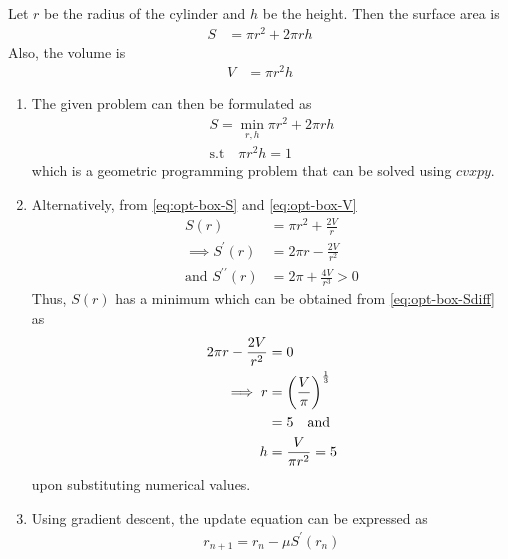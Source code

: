 \documentclass[journal,12pt,twocolumn]{IEEEtran}
\renewcommand\thesection{\arabic{section}}
\begin{document}
\begin{enumerate}[label=\thesection.\arabic*.,ref=\thesection.\theenumi]
\solution Let $r$ be the radius of the cylinder and $h$ be the height.  Then the surface area is 
		\begin{align}
			\label{eq:opt-box-S}
			S &= \pi r^2 + 2\pi r h 
		\end{align}
		Also, the volume is 
		\begin{align}
			\label{eq:opt-box-V}
			V &= \pi r^2 h 
		\end{align}
		\begin{enumerate}
			\item 
		The given problem can then be formulated as 
		\begin{align}
			S = \min_{r,h}\pi r^2 + 2\pi r h 
			\\
			\text{s.t} \quad \pi r^2 h =1 
		\end{align}
		which is a geometric programming problem that can be solved using $cvxpy$. 
	\item 
		Alternatively, from 
			\eqref{eq:opt-box-S} and 
			\eqref{eq:opt-box-V}
		\begin{align}
			S(r) &= \pi r^2 +  \frac{2 V}{r} 
			\\
			\label{eq:opt-box-Sdiff}
			\implies 
			S^{\prime}(r) &= 2\pi r -  \frac{2 V}{r^2} 
			\\
			\text{and }
			S^{\prime\prime}(r) &= 2\pi  +  \frac{4 V}{r^3} > 0 
		\end{align}
		Thus, $S(r)$ has a minimum which can be obtained from 
			\eqref{eq:opt-box-Sdiff} as
		\begin{align}
			2\pi r -  \frac{2 V}{r^2} &= 0
			\\
			\implies r &= \left(\frac{V}{\pi}\right)^{\frac{1}{3}}
			\\
			&= 5 \quad \text{and }
			\\
			h &= \frac{V}{\pi r^2} = 5
		\end{align}
		upon substituting numerical values.
	\item Using gradient descent, the update equation can be expressed as 
		\begin{align}
			r_{n+1} = r_n - \mu S^{\prime}(r_n)
		\end{align}


\end{enumerate}
\end{enumerate}
\end{document}
